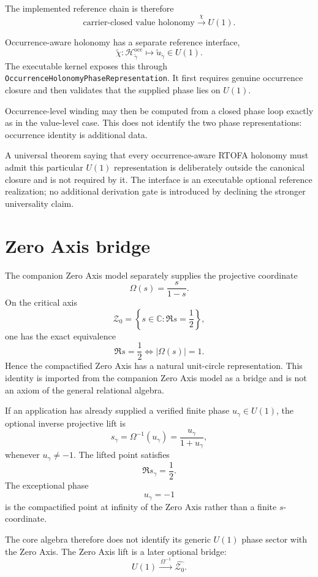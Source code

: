 \documentclass[11pt]{article}
\newcommand{\Zaxis}{\mathcal Z_{0}}
\begin{document}
The implemented reference chain is therefore
\[
\boxed{
\text{carrier-closed value holonomy}
\xrightarrow{\ \chi\ }
U(1).
}
\]

Occurrence-aware holonomy has a separate reference interface,
\[
\boxed{
\widetilde\chi:
\mathcal H^{\mathrm{occ}}_{\widetilde\gamma}
\longmapsto
\widetilde u_{\widetilde\gamma}\in U(1).
}
\]
The executable kernel exposes this through
\texttt{OccurrenceHolonomyPhaseRepresentation}. It first requires genuine
occurrence closure and then validates that the supplied phase lies on
\(U(1)\).

Occurrence-level winding may then be computed from a closed phase loop exactly
as in the value-level case. This does not identify the two phase
representations: occurrence identity is additional data.

A universal theorem saying that every occurrence-aware RTOFA holonomy must
admit this particular \(U(1)\) representation is deliberately outside the
canonical closure and is not required by it. The interface is an executable
optional reference realization; no additional derivation gate is introduced
by declining the stronger universality claim.

\section{Zero Axis bridge}

The companion Zero Axis model separately supplies the projective coordinate
\[
\boxed{
\Omega(s)=\frac{s}{1-s}.
}
\]
On the critical axis
\[
\Zaxis=\left\{s\in\mathbb C:\Re s=\frac12\right\},
\]
one has the exact equivalence
\[
\boxed{
\Re s=\frac12
\Longleftrightarrow
|\Omega(s)|=1.
}
\tag{ZA-BRIDGE}
\]
Hence the compactified Zero Axis has a natural unit-circle representation.
This identity is imported from the companion Zero Axis model as a bridge
\cite{LipaSOH2026} and is not an axiom of the general relational algebra.

If an application has already supplied a verified finite phase
\(u_{\gamma}\in U(1)\), the optional inverse projective lift is
\[
\boxed{
s_{\gamma}
=
\Omega^{-1}(u_{\gamma})
=
\frac{u_{\gamma}}{1+u_{\gamma}},
}
\]
whenever \(u_{\gamma}\neq-1\). The lifted point satisfies
\[
\Re s_{\gamma}=\frac12.
\]
The exceptional phase
\[
u_{\gamma}=-1
\]
is the compactified point at infinity of the Zero Axis rather than a finite
\(s\)-coordinate.

The core algebra therefore does not identify its generic \(U(1)\) phase
sector with the Zero Axis. The Zero Axis lift is a later optional bridge:
\[
\boxed{
U(1)
\xrightarrow{\ \Omega^{-1}\ }
\widehat{\Zaxis}.
}
\]
\end{document}
